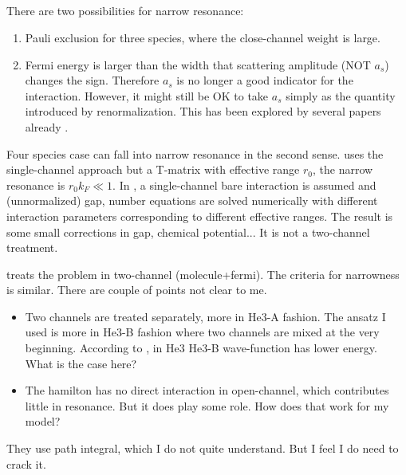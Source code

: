 \subsection{}
There are two possibilities for narrow resonance:  
\begin{enumerate}
\item Pauli exclusion for three species, where the close-channel weight is large.  
\item Fermi energy is larger than the width that scattering amplitude (NOT $a_{s}$) changes the sign.  Therefore $a_{s}$ is no longer a good indicator for the interaction.  However, it might still be OK to take $a_{s}$ simply as the quantity introduced by renormalization.   This has been explored by several papers already \cite{NarrowJensen1,NarrowJensen,GurarieNarrow}.  
\end{enumerate}
Four species case can fall into narrow resonance in  the second sense.  \cite{NarrowJensen1,NarrowJensen} uses the single-channel approach but a T-matrix with effective range $r_{0}$, the narrow resonance is $r_{0}k_{F}\ll1$.  In \cite{NarrowJensen}, a single-channel bare interaction is assumed and (unnormalized) gap, number equations  are  solved numerically with different interaction parameters corresponding to different effective ranges. The result is some small corrections in gap, chemical potential...   It is not a two-channel treatment.  

\cite{GurarieNarrow} treats the problem in two-channel (molecule+fermi).  The criteria for narrowness is similar.  There are couple of points not clear to me.   
\begin{itemize}
\item Two channels are treated separately, more in He3-A fashion.  The ansatz I used is more in He3-B fashion where two channels are mixed at the very beginning.   According to \cite{He3B}, in He3 He3-B wave-function has lower energy.  What is the case here?
\item The hamilton has no direct interaction in open-channel, which contributes little in resonance.  But it does play some role.  How does that work for my model?
\end{itemize}
They use path integral, which I do not quite understand.  But I feel I do need to crack it.  